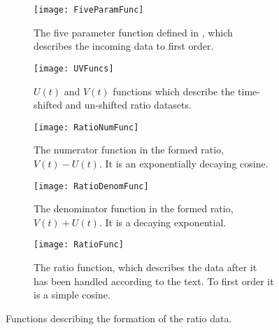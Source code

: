     \begin{figure}
    \centering
        \begin{subfigure}[t]{0.45\textwidth}
            \centering
            \texttt{[image: FiveParamFunc]}
            \caption{The five parameter function defined in , which describes the incoming data to first order.}
        \label{fig:fiveparamfunc}
        \end{subfigure}%

        \vspace{2mm}
        \begin{subfigure}[t]{0.45\textwidth}
            \centering
            \texttt{[image: UVFuncs]}
            \caption{$U(t)$ and $V(t)$ functions which describe the time-shifted and un-shifted ratio datasets.}
        \label{fig:UVfuncs}
        \end{subfigure}
        \hspace{5mm}
        \begin{subfigure}[t]{0.45\textwidth}
            \centering
            \texttt{[image: RatioNumFunc]}
            \caption{The numerator function in the formed ratio, $V(t) - U(t)$. It is an exponentially decaying cosine.}
        \label{fig:rationumfunc}
        \end{subfigure}%
        \vspace{2mm}
        \begin{subfigure}[t]{0.45\textwidth}
            \centering
            \texttt{[image: RatioDenomFunc]}
            \caption{The denominator function in the formed ratio, $V(t) + U(t)$. It is a decaying exponential.}
        \label{fig:ratiodenomfunc}
        \end{subfigure}
        \hspace{5mm}
        \begin{subfigure}[t]{0.45\textwidth}
            \centering
            \texttt{[image: RatioFunc]}
            \caption{The ratio function, which describes the data after it has been handled according to the text. To first order it is a simple cosine.}
        \label{fig:ratiofunc}
        \end{subfigure}%
    \caption[Ratio formation functions]{Functions describing the formation of the ratio data.}
    \label{fig:RatioFormationFunctions}
    \end{figure}


